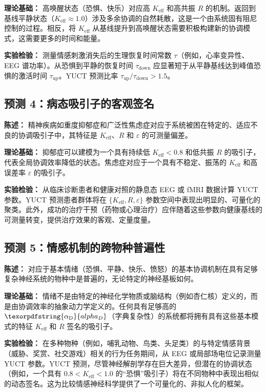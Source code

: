 \documentclass[12pt,a4paper]{article}
\DeclareRobustCommand{\alD}{\texorpdfstring{\ensuremath{\alpha_{\mathrm{D}}}}{alpha_D}}
\begin{document}
	\textbf{理论基础：} 高唤醒状态（恐惧、快乐）对应高 \(K_{\mathrm{eff}}\) 和高共振 \(R\) 的机制。返回到基线平静状态（\(K_{\mathrm{eff}} \approx 1.0\)）涉及多余协调的自然耗散，这是一个由系统固有阻尼控制的过程。相反，将 \(K_{\mathrm{eff}}\) 从基线提升到高唤醒状态需要积极构建新的协调模式，这需要更多的时间和能量。
	
	\textbf{实验检验：} 测量情感刺激消失后的生理恢复时间常数 \(\tau\)（例如，心率变异性、EEG 谱功率）。从恐惧到平静的恢复时间 \(\tau_{\text{down}}\) 应显著短于从平静基线达到峰值恐惧的激活时间 \(\tau_{\text{up}}\)。YUCT 预测比率 \(\tau_{\text{up}}/\tau_{\text{down}} > 1.5\)。
	
	\subsection{预测 4：病态吸引子的客观签名}
	
	\textbf{陈述：} 精神疾病如重度抑郁症和广泛性焦虑症对应于系统被困在特定的、适应不良的协调吸引子中，其特征是 \(K_{\mathrm{eff}}\)、\(R\) 和 \(\varepsilon\) 的可测量偏差。
	
	\textbf{理论基础：} 抑郁症可以建模为一个具有持续低 \(K_{\mathrm{eff}} < 0.8\) 和低共振 \(R\) 的吸引子，代表全局协调效率降低的状态。焦虑症对应于一个具有不稳定、振荡的 \(K_{\mathrm{eff}}\) 和高误差率 \(\varepsilon\) 的吸引子。
	
	\textbf{实验检验：} 从临床诊断患者和健康对照的静息态 EEG 或 fMRI 数据计算 YUCT 参数。YUCT 预测患者群体将在 \(\{K_{\mathrm{eff}}, R, \varepsilon\}\) 参数空间中表现出明显的、可量化的聚类。此外，成功的治疗干预（药物或心理治疗）应伴随着这些参数向健康基线的可测量转变，提供治疗效果的客观、定量度量。
	
	\subsection{预测 5：情感机制的跨物种普遍性}
	
	\textbf{陈述：} 对应于基本情绪（恐惧、平静、快乐、愤怒）的基本协调机制在具有足够复杂神经系统的物种中是普遍的，无论特定的神经基板如何。
	
	\textbf{理论基础：} 情绪不是由特定的神经化学物质或脑结构（例如杏仁核）定义的，而是由协调效率的抽象动力学定义的。任何具有足够高的 \(\alD\)（字典复杂性）的系统都将拥有具有这些基本模式的特征 \(K_{\mathrm{eff}}\) 和 \(R\) 签名的吸引子。
	
	\textbf{实验检验：} 在多种物种（例如，哺乳动物、鸟类、头足类）的与特定情感背景（威胁、奖赏、社交游戏）相关的行为任务期间，从 EEG 或局部场电位记录测量 YUCT 参数。YUCT 预测，尽管神经解剖学存在巨大差异，但潜在的协调状态（例如，一个具有 \(0.8 < K_{\mathrm{eff}} < 1.0\) 的“恐惧”吸引子）将在不同物种中表现出相似的动态签名。这为比较情感神经科学提供了一个可量化的、非拟人化的框架。
	
\end{document}
